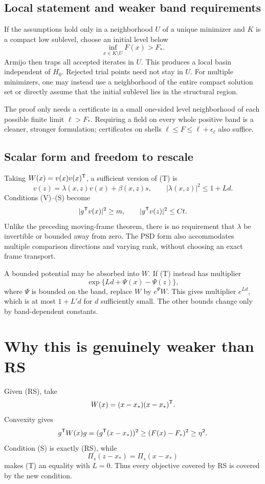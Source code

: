 \subsection{Local statement and weaker band requirements}
If the assumptions hold only in a neighborhood $U$ of a unique minimizer and $K$ is a compact low sublevel, choose an initial level below
\[
 \inf_{x\in K\setminus U}F(x)>F_*.
\]
Armijo then traps all accepted iterates in $U$. This produces a local basin independent of $H_0$. Rejected trial points need not stay in $U$. For multiple minimizers, one may instead use a neighborhood of the entire compact solution set or directly assume that the initial sublevel lies in the structural region.

The proof only needs a certificate in a small one-sided level neighborhood of each possible finite limit $\ell>F_*$. Requiring a field on every whole positive band is a cleaner, stronger formulation; certificates on shells $\ell\le F\le\ell+\epsilon_\ell$ also suffice.

\subsection{Scalar form and freedom to rescale}
Taking $W(x)=v(x)v(x)^{\mathsf T}$, a sufficient version of (T) is
\[
 v(z)=\lambda(x,z)v(x)+\beta(x,z)s,\qquad
 |\lambda(x,z)|^2\le1+L d.
\]
Conditions (V)--(S) become
\[
 |g^{\mathsf T} v(x)|^2\ge m,\qquad |y^{\mathsf T} v(z)|^2\le Ct.
\]
Unlike the preceding moving-frame theorem, there is no requirement that $\lambda$ be invertible or bounded away from zero. The PSD form also accommodates multiple comparison directions and varying rank, without choosing an exact frame transport.

A bounded potential may be absorbed into $W$. If (T) instead has multiplier
\[
 \exp\{L d+\Psi(x)-\Psi(z)\},
\]
where $\Psi$ is bounded on the band, replace $W$ by $e^{\Psi}W$. This gives multiplier $e^{Ld}$, which is at most $1+L'd$ for $d$ sufficiently small. The other bounds change only by band-dependent constants.


\setcounter{section}{3}
\setcounter{theorem}{1}
\setcounter{lemma}{0}
\setcounter{corollary}{0}
\setcounter{proposition}{0}
\setcounter{remark}{0}
\setcounter{equation}{6}
\section{Why this is genuinely weaker than RS}
Given (RS), take
\[
 W(x)=(x-x_*)(x-x_*)^{\mathsf T}.
\]
Convexity gives
\[
 g^{\mathsf T} W(x)g=(g^{\mathsf T}(x-x_*))^2\ge(F(x)-F_*)^2\ge\eta^2.
\]
Condition (S) is exactly (RS), while
\[
 \Pi_s(z-x_*)=\Pi_s(x-x_*)
\]
makes (T) an equality with $L=0$. Thus every objective covered by RS is covered by the new condition.

